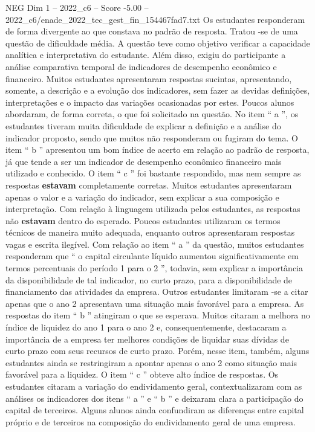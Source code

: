 \begin{textsample}{NEG Dim 1 – 2022\_c6 – Score -5.00 – 2022\_c6/enade\_2022\_tec\_gest\_fin\_154467fad7.txt}
Os estudantes responderam de forma divergente ao que constava no padrão de resposta.
Tratou -se de uma questão de dificuldade média.
A questão teve como objetivo verificar a capacidade analítica e interpretativa do estudante.
Além disso, exigiu do participante a análise comparativa temporal de indicadores de desempenho econômico e financeiro.
Muitos estudantes apresentaram respostas sucintas, apresentando, somente, a descrição e a evolução dos indicadores, sem fazer as devidas definições, interpretações e o impacto das variações ocasionadas por estes.
Poucos alunos abordaram, de forma correta, o que foi solicitado na questão.
No item “ a ”, os estudantes tiveram muita dificuldade de explicar a definição e a análise do indicador proposto, sendo que muitos não responderam ou fugiram do tema.
O item “ b ” apresentou um bom índice de acerto em relação ao padrão de resposta, já que tende a ser um indicador de desempenho econômico financeiro mais utilizado e conhecido.
O item “ c ” foi bastante respondido, mas nem sempre as respostas \textbf{estavam} completamente corretas.
Muitos estudantes apresentaram apenas o valor e a variação do indicador, sem explicar a sua composição e interpretação.
Com relação à linguagem utilizada pelos estudantes, as respostas não \textbf{estavam} dentro do esperado.
Poucos estudantes utilizaram os termos técnicos de maneira muito adequada, enquanto outros apresentaram respostas vagas e escrita ilegível.
Com relação ao item “ a ” da questão, muitos estudantes responderam que “ o capital circulante líquido aumentou significativamente em termos percentuais do período 1 para o 2 ”, todavia, sem explicar a importância da disponibilidade de tal indicador, no curto prazo, para a disponibilidade de financiamento das atividades da empresa.
Outros estudantes limitaram -se a citar apenas que o ano 2 apresentava uma situação mais favorável para a empresa.
As respostas do item “ b ” atingiram o que se esperava.
Muitos citaram a melhora no índice de liquidez do ano 1 para o ano 2 e, consequentemente, destacaram a importância de a empresa ter melhores condições de liquidar suas dívidas de curto prazo com seus recursos de curto prazo.
Porém, nesse item, também, alguns estudantes ainda se restringiram a apontar apenas o ano 2 como situação mais favorável para a liquidez.
O item “ c ” obteve alto índice de respostas.
Os estudantes citaram a variação do endividamento geral, contextualizaram com as análises os indicadores dos itens “ a ” e “ b ” e deixaram clara a participação do capital de terceiros.
Alguns alunos ainda confundiram as diferenças entre capital próprio e de terceiros na composição do endividamento geral de uma empresa.

\end{textsample}
